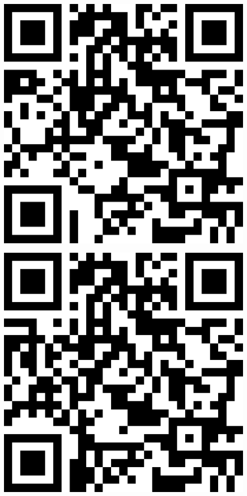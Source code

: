 \documentclass[letterpaper]{article}
\begin{document}
 \endgroup 
 \vspace*{\fill} 
 \pagebreak 
{} 
 \vspace*{\fill} 
 \begingroup 
 \centerline{\includegraphics[scale=1,width=5in,height=5in]{Office3673.png}} 
 \endgroup 
 \vspace*{\fill} 
 \pagebreak 
{} 
 \vspace*{\fill} 
 \begingroup 
 \centerline{\includegraphics[scale=1,width=5in,height=5in]{Office3675.png}} 
\end{document}
